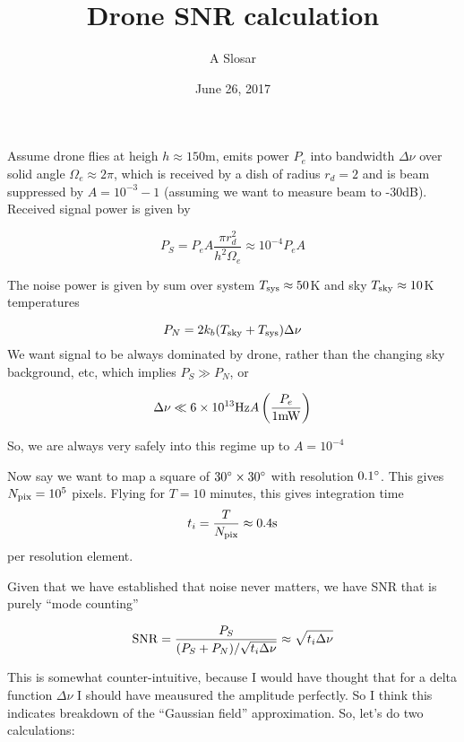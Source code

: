 \documentclass{article}
\begin{document}
\title{Drone SNR calculation}
\author{A Slosar}
\date{June 26, 2017}
\maketitle

\newcommand{\Dnu}{\Delta \nu}
Assume drone flies at heigh $h\approx150$m, emits power $P_e$ into
bandwidth $\Dnu$ over solid angle
$\Omega_e\approx 2\pi$, which is received by a dish of radius $r_d=2$
and is beam suppressed by $A=10^{-3}-1$ (assuming we want to measure
beam to -30dB).  Received signal power is given by

\begin{equation}
  P_S = P_e A \frac{\pi r_d^2}{h^2\Omega_e} \approx 10^{-4} P_e A
\end{equation}

The noise power is given by sum over system $T_{\rm sys}\approx 50$K
and sky $T_{\rm sky} \approx 10$K temperatures

\begin{equation}
  P_N = 2 k_b (T_{\rm sky} + T_{\rm sys}) \Dnu
\end{equation}
We want signal to be always dominated by drone, rather than the
changing sky background, etc, which implies $P_S \gg P_N$, or 

\begin{equation}
  \Dnu \ll 6\times 10^{13} {\rm Hz} A \left(\frac{P_e}{\rm 1  mW}\right)
\end{equation}

So, we are always very safely into this regime up to $A=10^{-4}$

Now say we want to map a square of $30\degree\times30\degree$
with resolution $0.1\degree$. This gives $N_{\rm pix} = 10^5$
pixels. Flying for $T=10$ minutes, this gives integration time
\begin{equation}
  t_i = \frac{T}{N_{\rm pix}}\approx 0.4{\rm s}
\end{equation}
per resolution element.

Given that we have established that noise never matters, we have SNR
that is purely ``mode counting''

\begin{equation}
  {\rm SNR} = \frac{P_S}{(P_S + P_N) / \sqrt{t_i \Dnu }} \approx \sqrt{t_i \Dnu}
\end{equation}

This is somewhat counter-intuitive, because I would have thought that
for a delta function $\Dnu$ I should have meausured the amplitude
perfectly. So I think this indicates breakdown of the ``Gaussian
field'' approximation. So, let's do two calculations:
\end{document}
